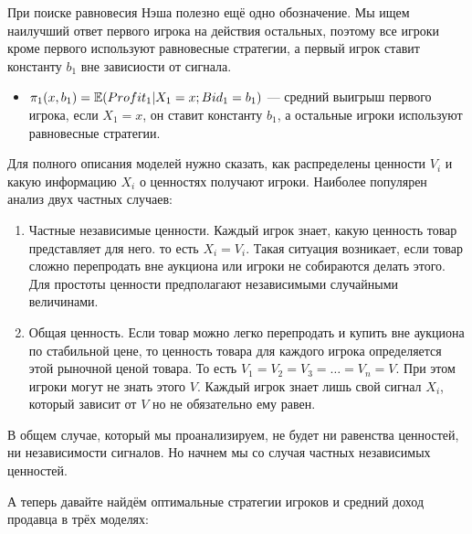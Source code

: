 При поиске равновесия Нэша полезно ещё одно обозначение. Мы ищем наилучший ответ первого игрока на действия остальных, поэтому все игроки кроме первого используют равновесные стратегии, а первый игрок ставит константу $b_1$ вне зависиости от сигнала.

\begin{itemize}



\item $\pi_{1}(x,b_{1})=\mathbb{E}(Profit_{1}|X_{1}=x ; Bid_{1}=b_{1})$ — средний выигрыш первого игрока, если $ X_{1}=x $, он ставит константу $b_{1} $, а остальные игроки используют равновесные стратегии.
\end{itemize}

\newpage


Для полного описания моделей нужно сказать, как распределены ценности $ V_{i} $ и какую информацию $ X_{i} $ о ценностях получают игроки. Наиболее популярен анализ двух частных случаев:
\begin{enumerate}
\item Частные независимые ценности. Каждый игрок знает, какую ценность товар представляет для него. то есть $X_{i}=V_{i}$.
Такая ситуация возникает, если товар сложно перепродать вне аукциона или игроки не собираются делать этого. Для простоты ценности предполагают независимыми случайными величинами.
\item Общая ценность. Если товар можно легко перепродать и купить вне аукциона по стабильной цене, то ценность товара для каждого игрока определяется этой рыночной ценой товара. То есть $ V_{1}=V_{2}=V_{3}=\ldots=V_{n}=V $. При этом игроки могут не знать этого $ V $. Каждый игрок знает лишь свой сигнал $ X_{i} $, который зависит от $ V $ но не обязательно ему равен.
\end{enumerate}

В общем случае, который мы проанализируем, не будет ни равенства ценностей, ни независимости сигналов. Но начнем мы со случая частных независимых ценностей.

А теперь давайте найдём оптимальные стратегии игроков и средний доход продавца в трёх моделях:

